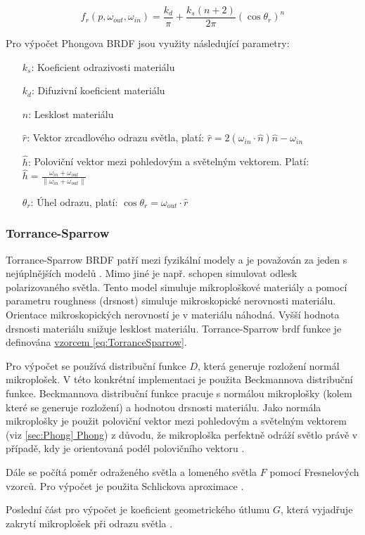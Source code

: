 \documentclass[czech,master,dept460,male,cpp,cpdeclaration]{diploma}
\newcommand{\uvec}[1]{\hat{#1}}
\begin{document}
\begin{equation} \label{eq:phongPhysicalBRDF}
    f_r\left(p,\omega_{out},\omega_{in}\right) = \frac{k_d}{\pi} +
    \frac{k_s\left(n+2\right)}{2\pi}\left(\cos\theta_r\right)^n
\end{equation}

Pro výpočet Phongova BRDF jsou využity následující parametry: 
\begin{itemize}
    \item[$k_s$:] Koeficient odrazivosti materiálu
    \item[$k_d$:] Difuzivní koeficient materiálu
    \item[$n$:] Lesklost materiálu
    \item[$\uvec{r}$:] Vektor zrcadlového odrazu světla, platí: $\uvec{r} = 2\left(\omega_{in}\cdot\uvec{n}\right)\uvec{n}-\omega_{in}$
    \item[$\uvec{h}$:] Poloviční vektor mezi pohledovým a světelným vektorem. Platí: $\uvec{h} = \frac{\omega_{in} + \omega_{out}}{\| \omega_{in} + \omega_{out}\|}$
    \item[$\theta_r$:] Úhel odrazu, platí: $\cos\theta_r = \omega_{out}\cdot\uvec{r}$
\end{itemize}

\subsubsection{Torrance-Sparrow}
Torrance-Sparrow BRDF patří mezi fyzikální modely a je považován za jeden s nejúplnějších modelů \cite{BRDFOverview}. Mimo jiné je např. schopen simulovat odlesk polarizovaného světla. Tento model simuluje mikroploškové materiály a pomocí parametru roughness (drsnost) simuluje mikroskopické nerovnosti materiálu. Orientace mikroskopických nerovností je v materiálu náhodná. Vyšší hodnota drsnosti materiálu snižuje lesklost materiálu. Torrance-Sparrow brdf funkce je definována \hyperref[eq:TorranceSparrow]{vzorcem \ref{eq:TorranceSparrow}}. \par 
Pro výpočet se používá distribuční funkce $D$, která generuje rozložení normál mikroplošek. V této konkrétní implementaci je použita Beckmannova distribuční funkce. Beckmannova distribuční funkce pracuje s normálou mikroplošky (kolem které se generuje rozložení) a hodnotou drsnosti materiálu. Jako normála mikroplošky je použit poloviční vektor mezi pohledovým a světelným vektorem (viz \hyperref[sec:Phong]{\ref{sec:Phong} Phong}) z důvodu, že mikroploška perfektně odráží světlo právě v případě, kdy je orientovaná podél polovičního vektoru \cite{PHARR2017507}. \par
Dále se počítá poměr odraženého světla a lomeného světla $F$ pomocí Fresnelových vzorců. Pro výpočet je použita Schlickova aproximace \cite{SchlickFresnel}. \par
Poslední část pro výpočet je koeficient geometrického útlumu $G$, která vyjadřuje zakrytí mikroplošek při odrazu světla \cite{BRDFOverview}.
\end{document}
